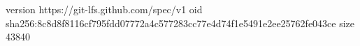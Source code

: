 version https://git-lfs.github.com/spec/v1
oid sha256:8c8d8f8116cf795fdd07772a4c577283cc77e4d74f1e5491e2ee25762fe043ce
size 43840
